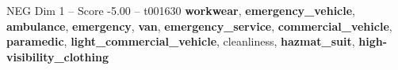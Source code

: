 \begin{textsample}{NEG Dim 1 – Score -5.00 – t001630}  \label{ex:f1_neg_009}
\textbf{workwear}, \textbf{emergency\_vehicle}, \textbf{ambulance}, \textbf{emergency}, \textbf{van}, \textbf{emergency\_service}, \textbf{commercial\_vehicle}, \textbf{paramedic}, \textbf{light\_commercial\_vehicle}, cleanliness, \textbf{hazmat\_suit}, \textbf{high-visibility\_clothing}

\end{textsample}

